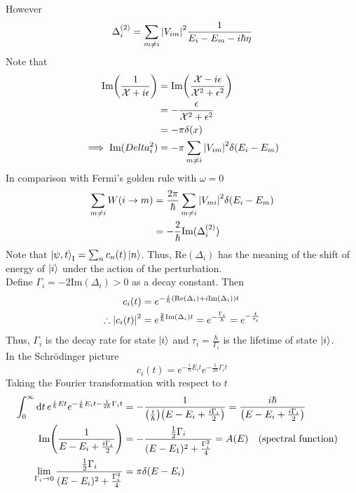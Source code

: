 \documentclass[12pt,a4paper,titlepage]{article}
\newcommand{\trm}[1]{\textrm{#1}} %
\newcommand{\Chi}{\mathcal{X}} %
\renewcommand{\Re}{\trm{Re}} %
\renewcommand{\Im}{\trm{Im}} %
\begin{document}
However
\begin{equation}
\Delta_{i}^{(2)}=\sum_{m\neq i}\abs{V_{im}}^{2}\frac{1}{E_{i}-E_{m}-i\hbar\eta}
\end{equation}
Note that
\begin{equation}
\begin{aligned}
\Im\qty(\frac{1}{\Chi+i\epsilon})&=\Im\qty(\frac{\Chi-i\epsilon}{\Chi^{2}+\epsilon^{2}})\\
&=-\frac{\epsilon}{\Chi^{2}+\epsilon^{2}}\\
&=-\pi\delta(x)\\
\implies \Im(Delta_{i}^{2})&=-\pi\sum_{m\neq i}\abs{V_{im}}^{2}\delta(E_{i}-E_{m})
\end{aligned}
\end{equation}
In comparison with Fermi's golden rule with $\omega=0$
\begin{equation}
\begin{aligned}
\sum_{m\neq i}W(i\rightarrow m)&=\frac{2\pi}{\hbar}\sum_{m\neq i}\abs{V_{mi}}^{2}\delta(E_{i}-E_{m})\\
&=-\frac{2}{\hbar}\Im(\Delta_{i}^{(2)})
\end{aligned}
\end{equation}
Note that $\ket{\psi,t}_{\trm{I}}=\sum_{n}c_{n}(t)\ket{n}$. Thus, $\Re(\Delta_{i})$ has the meaning of the shift of energy of $\ket{i}$ under the action of the perturbation.\\

Define $\Gamma_{i}=-2\Im(\Delta_{i})>0$ as a decay constant. Then
\begin{equation}
\begin{aligned}
c_{i}(t)&=e^{-\frac{i}{\hbar}\qty(\Re(\Delta_{i})+i\Im(\Delta_{i}))t}\\
\therefore \abs{c_{i}(t)}^{2}&=e^{\frac{2}{\hbar}\Im(\Delta_{i})t}=e^{-\frac{\Gamma_{i}}{\hbar}}=e^{-\frac{t}{\tau_{i}}}
\end{aligned}
\end{equation}
Thus, $\Gamma_{i}$ is the decay rate for state $\ket{i}$ and $\tau_{i}=\frac{\hbar}{\Gamma_{i}}$ is the lifetime of state $\ket{i}$.\\

In the Schr\"{o}dinger picture
\begin{equation}
c_{i}(t)=e^{-\frac{i}{\hbar}E_{i}t}e^{-\frac{1}{2\hbar}\Gamma_{i}t}
\end{equation}
Taking the Fourier transformation with respect to $t$
\begin{equation}
\begin{aligned}
\int_{0}^{\infty}\dd{t}e^{\frac{i}{\hbar}Et}e^{-\frac{i}{\hbar}E_{i}t-\frac{1}{2\hbar}\Gamma_{i}t}&=-\frac{1}{\qty(\frac{i}{\hbar})\qty(E-E_{i}+\frac{i\Gamma_{i}}{2})}=\frac{i\hbar}{\qty(E-E_{i}+\frac{i\Gamma_{i}}{2})}\\
\Im\qty(\frac{1}{E-E_{i}+\frac{i\Gamma_{i}}{2}})&=-\frac{\frac{1}{2}\Gamma_{i}}{(E-E_{1})^{2}+\frac{\Gamma_{i}^{2}}{4}}=A(E)\qq{(spectral function)}\\
\lim_{\Gamma_{i}\rightarrow 0}\frac{\frac{1}{2}\Gamma_{i}}{(E-E_{i})^{2}+\frac{\Gamma_{i}^{2}}{4}}&=\pi\delta(E-E_{i})
\end{aligned}
\end{equation}
\end{document}
